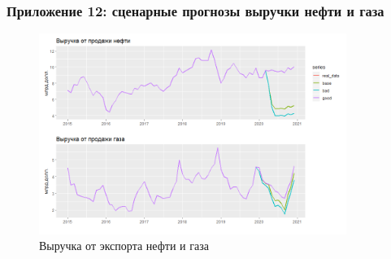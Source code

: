 \documentclass[9pt]{beamer}
\begin{document}
\begin{frame}
	\frametitle{Приложение 12: сценарные прогнозы выручки нефти и газа}
	\begin{figure}[htp]
		\centering
		\includegraphics[width=10cm]{oil_2015.png}
		\caption{Выручка от экспорта нефти и газа}\label{fi:9}
	\end{figure}
\end{frame}
\end{document}
